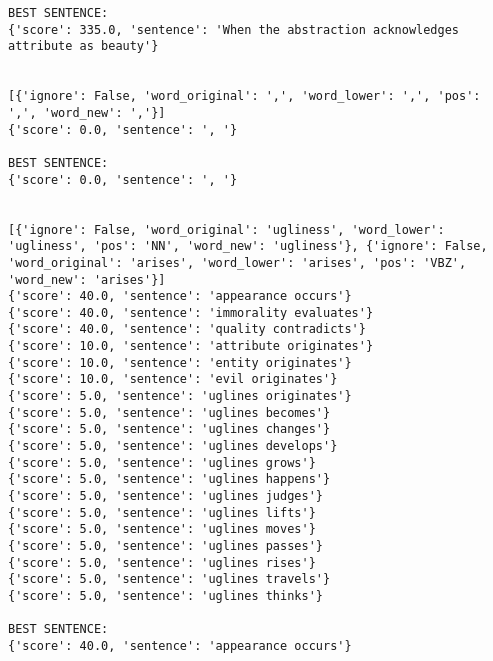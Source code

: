 \documentclass[12pt,a4paper,oneside]{book}
\begin{document}
\begin{verbatim}
BEST SENTENCE:
{'score': 335.0, 'sentence': 'When the abstraction acknowledges attribute as beauty'}


[{'ignore': False, 'word_original': ',', 'word_lower': ',', 'pos': ',', 'word_new': ','}]
{'score': 0.0, 'sentence': ', '}

BEST SENTENCE:
{'score': 0.0, 'sentence': ', '}


[{'ignore': False, 'word_original': 'ugliness', 'word_lower': 'ugliness', 'pos': 'NN', 'word_new': 'ugliness'}, {'ignore': False, 'word_original': 'arises', 'word_lower': 'arises', 'pos': 'VBZ', 'word_new': 'arises'}]
{'score': 40.0, 'sentence': 'appearance occurs'}
{'score': 40.0, 'sentence': 'immorality evaluates'}
{'score': 40.0, 'sentence': 'quality contradicts'}
{'score': 10.0, 'sentence': 'attribute originates'}
{'score': 10.0, 'sentence': 'entity originates'}
{'score': 10.0, 'sentence': 'evil originates'}
{'score': 5.0, 'sentence': 'uglines originates'}
{'score': 5.0, 'sentence': 'uglines becomes'}
{'score': 5.0, 'sentence': 'uglines changes'}
{'score': 5.0, 'sentence': 'uglines develops'}
{'score': 5.0, 'sentence': 'uglines grows'}
{'score': 5.0, 'sentence': 'uglines happens'}
{'score': 5.0, 'sentence': 'uglines judges'}
{'score': 5.0, 'sentence': 'uglines lifts'}
{'score': 5.0, 'sentence': 'uglines moves'}
{'score': 5.0, 'sentence': 'uglines passes'}
{'score': 5.0, 'sentence': 'uglines rises'}
{'score': 5.0, 'sentence': 'uglines travels'}
{'score': 5.0, 'sentence': 'uglines thinks'}

BEST SENTENCE:
{'score': 40.0, 'sentence': 'appearance occurs'}



\end{verbatim}
\end{document}
